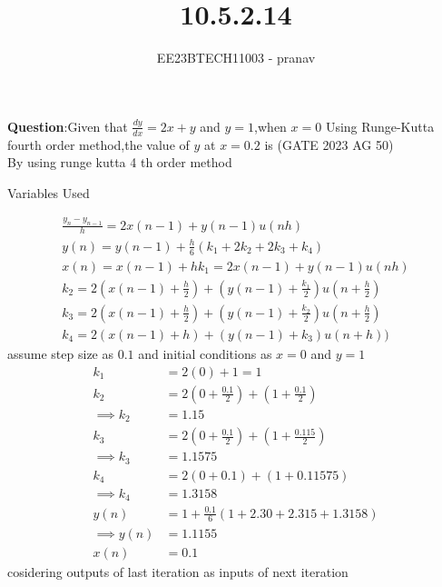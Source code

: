 \documentclass[journal,12pt,twocolumn]{IEEEtran}
\theoremstyle{remark}
\begin{document}

\vspace{3cm}

\title{10.5.2.14}
\author{EE23BTECH11003 - pranav}
\maketitle
\newpage

\bigskip
\renewcommand{\thefigure}{\arabic{figure}}
\renewcommand{\thetable}{\arabic{table}}

\textbf{Question}:Given that $\frac{dy}{dx}=2x+y$ and $y=1$,when $x=0$ Using Runge-Kutta fourth order method,the value of $y$ at $x=0.2$ is \hfill(GATE 2023 AG 50) 
\solution\\
By using runge kutta 4 th order method\\
\begin{table}[h]
    \centering
    
    \caption{Variables Used}
    \label{ag:50}
\end{table}
\begin{align}
\frac{y_{n}-y_{n-1}}{h}=2x(n-1)+y(n-1)u(nh)\\
y(n)= y(n-1)+\frac{h}{6}(k_1+2k_2+2k_3+k_4)\\
    x(n)=x(n-1)+h
    k_1=2x(n-1)+y(n-1)u(nh)\\
    k_2=2(x(n-1)+\frac{h}{2})+(y(n-1)+\frac{k_{1}}{2})u(n+\frac{h}{2})\\
    k_3=2(x(n-1)+\frac{h}{2})+(y(n-1)+\frac{k_{2}}{2})u(n+\frac{h}{2})\\
    k_4=2(x(n-1)+h)+(y(n-1)+k_{3})u(n+h))
\end{align}
assume step size as $0.1$ and initial conditions as $x=0$ and $y=1$\\
\begin{align}
    k_1&=2(0)+1=1\\
    k_2&=2(0+\frac{0.1}{2})+(1+\frac{0.1}{2})\\
    \implies k_2&= 1.15\\
    k_3&=2(0+\frac{0.1}{2})+(1+\frac{0.115}{2})\\
    \implies k_3&=1.1575\\
    k_4&=2(0+0.1)+(1+0.11575)\\
    \implies k_4&=1.3158\\
    y(n)&=1+\frac{0.1}{6}(1+2.30+2.315+1.3158)\\
    \implies y(n)&=1.1155\\
    x(n)&=0.1
\end{align}
cosidering outputs of last iteration as inputs of next iteration\\
\end{document}
